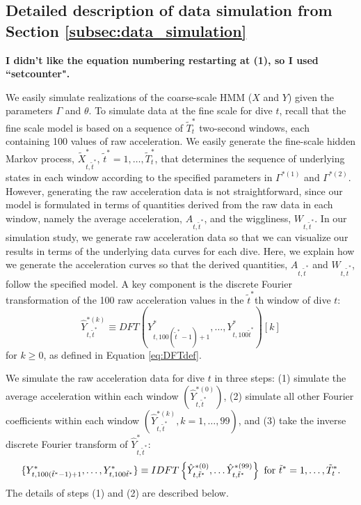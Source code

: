 \subsection{Detailed description of data simulation from Section \ref{subsec:data_simulation}}


\setcounter{equation}{4}   %

{\bf{I didn't like the equation numbering restarting at (1), so I used ``setcounter".}}

We easily simulate realizations of the coarse-scale HMM ($X$ and $Y$) given the parameters $\Gamma$ and $\theta$. 
To simulate data at the fine scale 
for dive $t$, recall that the fine scale model is based on a sequence of $\tilde T_t^*$ two-second windows, each containing 100 values of raw acceleration.  
 We easily generate the fine-scale hidden Markov process,  $\tilde X ^* _{t,\tilde t^*}$,
$\tilde t^*=1,\ldots,\tilde T_t^*$, that determines the sequence of underlying states in each window according to the specified parameters in $\Gamma^{*(1)}$ and $\Gamma^{*(2)}$.
 However, generating the raw acceleration data is not straightforward, since our model is formulated in terms of quantities derived from the raw data in each window, namely the average acceleration, $A_{t,\tilde t^*}$, and the wiggliness, $W_{ t,\tilde t^*}$. In our simulation study, we generate raw acceleration data so that we can visualize our results in terms of the underlying data curves for each dive.  Here, we explain how we generate the acceleration curves  so that the derived quantities, $A_{t,\tilde t^*}$ and $W_{ t,\tilde t^*}$, follow the specified model. A key component is the discrete Fourier transformation of the  100 raw acceleration values in the $\tilde{t}^*$th window of dive $t$:
\[
\hat{Y}^{*(k)}_{t,\tilde{t}^*}  \equiv DFT(Y^*_{t,100 (\tilde{t}^*-1) + 1 },\ldots, Y^*_{t,100 \tilde{t}^*})[k]
\]
for $k \ge 0$, as defined in Equation \ref{eq:DFTdef}.

 We simulate the raw acceleration data for dive $t$ in three steps: (1) simulate the average acceleration within each window $\left(\hat Y^{*(0)}_{t,\tilde t^*}\right)$, (2) simulate all other Fourier coefficients within each window $\left(\hat Y^{*(k)}_{t,\tilde t^*}, k = 1,\ldots,99\right)$, and (3) take the inverse discrete Fourier transform of $\hat{Y}^*_{t,\tilde t^*}$:
 \[
 \{Y^*_{t,100(\tilde t^* - 1) + 1},\ldots,Y^*_{t,100\tilde t^*}\} \equiv IDFT\left\{\hat{Y}^{*(0)}_{t,\tilde t^*},
 \ldots \hat{Y}^{*(99)}_{t,\tilde t^*}\right\}
    {\rm{~for~}} \tilde t^* = 1,\ldots,\tilde T^*_t.
 \]
The details of steps (1) and (2) are described below.

